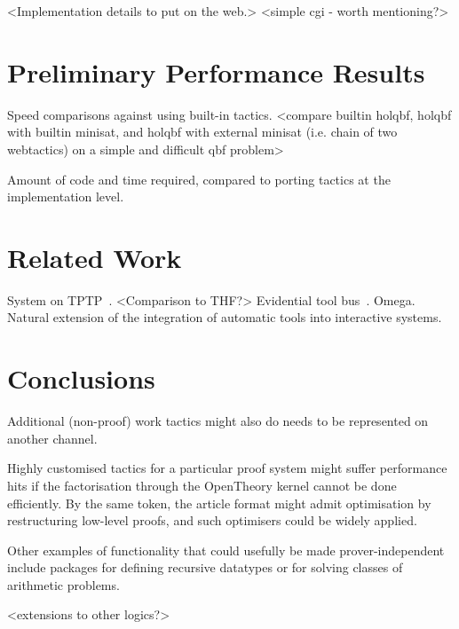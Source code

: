 \documentclass{llncs}
\begin{document}
<Implementation details to put on the web.>
<simple cgi - worth mentioning?>

\section{Preliminary Performance Results}
\label{sec:performance}

Speed comparisons against using built-in tactics.
<compare builtin holqbf, holqbf with builtin minisat, and holqbf with external minisat (i.e. chain of two webtactics) on a simple and difficult qbf problem>

Amount of code and time required, compared to porting tactics at the implementation level.

\section{Related Work}

System on TPTP~\cite{DBLP:conf/lpar/Sutcliffe10}.
<Comparison to THF?>
Evidential tool bus~\cite{DBLP:conf/icfem/Rushby05,fk:etb}.
Omega.
Natural extension of the integration of automatic tools into interactive systems.

\section{Conclusions}
Additional (non-proof) work tactics might also do needs to be represented on another channel.

Highly customised tactics for a particular proof system might suffer performance hits if the factorisation through the OpenTheory kernel cannot be done efficiently.
By the same token, the article format might admit optimisation by restructuring low-level proofs, and such optimisers could be widely applied.

Other examples of functionality that could usefully be made prover-independent include packages for defining recursive datatypes or for solving classes of arithmetic problems.

<extensions to other logics?>



\end{document}
